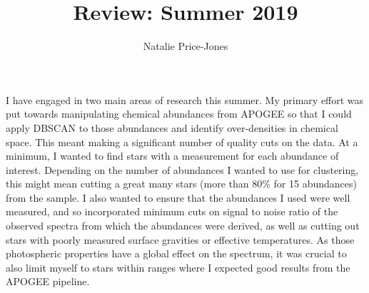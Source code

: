\documentclass[11pt]{article}
\begin{document}
\author{Natalie Price-Jones}
\title{Review: Summer 2019}
\maketitle

\medskip

I have engaged in two main areas of research this summer. My primary effort was put towards manipulating chemical abundances from APOGEE \citep{Majewski2015} so that I could apply DBSCAN \citep{Ester1996} to those abundances and identify over-densities in chemical space. This meant making a significant number of quality cuts on the data. At a minimum, I wanted to find stars with a measurement for each abundance of interest. Depending on the number of abundances I wanted to use for clustering, this might mean cutting a great many stars (more than 80\% for 15 abundances) from the sample. I also wanted to ensure that the abundances I used were well measured, and so incorporated minimum cuts on signal to noise ratio of the observed spectra from which the abundances were derived, as well as cutting out stars with poorly measured surface gravities or effective temperatures. As those photospheric properties have a global effect on the spectrum, it was crucial to also limit myself to stars within ranges where I expected good results from the APOGEE pipeline. 
\end{document}
